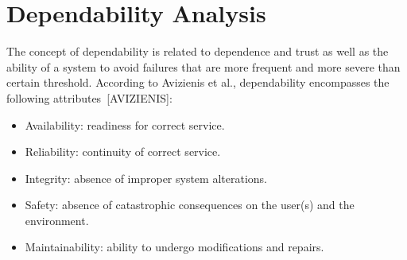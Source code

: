 \section{Dependability Analysis}

The concept of dependability is related to dependence and trust as well as the ability of a system to avoid failures that are more frequent and more severe than certain threshold. According to Avizienis et al., dependability encompasses the following attributes~[AVIZIENIS]: 

\begin{itemize}

\item Availability: readiness for correct service.
\medskip

\item Reliability: continuity of correct service.

\item Integrity: absence of improper system alterations.
\medskip

\item Safety: absence of catastrophic consequences on the user(s) and the environment.
\medskip

\item Maintainability: ability to undergo modifications and repairs.
\medskip

\end{itemize}



